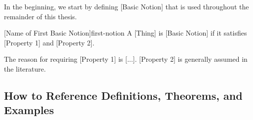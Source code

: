 
In the beginning, we start by defining [Basic Notion] that is used throughout the 
remainder of this thesis.

\begin{Definition}{[Name of First Basic Notion]}{first-notion}
    A [Thing] is [Basic Notion] if it satisfies [Property 1] and [Property 2].
\end{Definition}

The reason for requiring [Property 1] is [...]. 
[Property 2] is generally assumed in the literature.

\begin{example}\label{ex:first-notion}
\end{example}

\begin{example}\label{ex:first-notion-second-example}
\end{example}

\subsection*{How to Reference Definitions, Theorems, and Examples}

